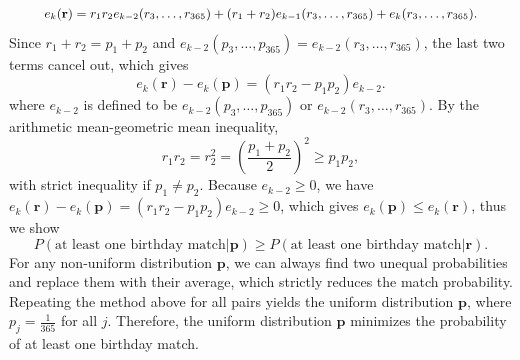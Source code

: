 {\begin{solution}
{\begin{equation*}
            \mbox{\small $e_k (\mathbf{r}) = r_1 r_2 e_{k-2}(r_3, \dots, r_{365}) + (r_1 + r_2) e_{k-1}(r_3, \dots, r_{365}) + e_k(r_3, \dots, r_{365}).$} 
        \end{equation*}
        Since $r_1 + r_2 = p_1 + p_2$ and $e_{k-2} (p_3, \dots, p_{365}) = e_{k-2} (r_3, \dots, r_{365})$, the last two terms cancel out, which gives 
        \begin{equation*}
            e_k (\mathbf{r}) - e_k (\mathbf{p}) = (r_1 r_2 - p_1 p_2) e_{k-2}. 
        \end{equation*}
        where $e_{k-2}$ is defined to be $e_{k-2} (p_3, \dots, p_{365})$ or $e_{k-2} (r_3, \dots, r_{365})$. 
        By the arithmetic mean-geometric mean inequality, 
        \begin{equation*}
            r_1 r_2 = r_2^2 = \left( \frac{p_1 + p_2}{2} \right)^2 \geq p_1 p_2, 
        \end{equation*}
        with strict inequality if $p_1 \neq p_2$. Because $e_{k-2} \geq 0$, we have $e_k (\mathbf{r}) - e_k (\mathbf{p}) = (r_1 r_2 - p_1 p_2) e_{k-2} \geq 0$, which gives $e_k (\mathbf{p}) \leq e_k (\mathbf{r})$, thus we show 
        \begin{equation*}
            P(\text{at least one birthday match}|\mathbf{p}) \geq P(\text{at least one birthday match}|\mathbf{r}). 
        \end{equation*}
        For any non-uniform distribution $\mathbf{p}$, we can always find two unequal probabilities and replace them with their average, which strictly reduces the match probability. 
        Repeating the method above for all pairs yields the uniform distribution $\mathbf{p}$, where $p_j = \frac{1}{365}$ for all $j$. 
        Therefore, the uniform distribution $\mathbf{p}$ minimizes the probability of at least one birthday match. 
    }
    \end{solution}
}
